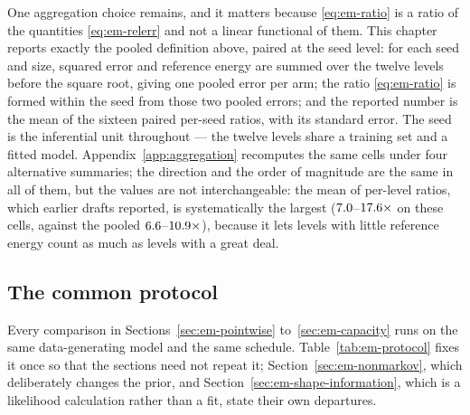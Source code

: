 One aggregation choice remains, and it matters because \eqref{eq:em-ratio} is a
ratio of the quantities \eqref{eq:em-relerr} and not a linear functional of
them. This chapter reports exactly the pooled definition above, paired at the
seed level: for each seed and size, squared error and reference energy are
summed over the twelve levels before the square root, giving one pooled error
per arm; the ratio \eqref{eq:em-ratio} is formed within the seed from those
two pooled errors; and the reported number is the mean of the sixteen paired
per-seed ratios, with its standard error. The seed is the inferential unit
throughout --- the twelve levels share a training set and a fitted model.
Appendix~\ref{app:aggregation} recomputes the same cells under four
alternative summaries; the direction and the order of magnitude are the same
in all of them, but the values are not interchangeable: the mean of
per-level ratios, which earlier drafts reported, is systematically the
largest ($7.0$--$17.6\times$ on these cells,
against the pooled $6.6$--$10.9\times$), because it lets levels
with little reference energy count as much as levels with a great deal.

\subsection{The common protocol}

Every comparison in Sections~\ref{sec:em-pointwise} to~\ref{sec:em-capacity}
runs on the same data-generating model and the same schedule.
Table~\ref{tab:em-protocol} fixes it once so that the sections need not repeat
it; Section~\ref{sec:em-nonmarkov}, which deliberately changes the prior, and
Section~\ref{sec:em-shape-information}, which is a likelihood calculation rather
than a fit, state their own departures.

